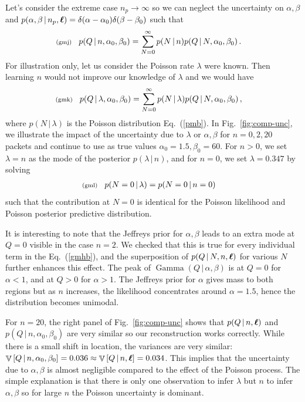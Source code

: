 \documentclass[11pt]{article}
\newcommand{\lleq}[1]{\label{#1} }
\renewcommand{\lleq}[1]{\label{#1} {\scriptstyle {\rm (#1)}} \hspace*{2ex} }
\newcommand{\cond}{\,|\,}
\newcommand{\refeq}[1]{Eq.~(\ref{#1})}
\newcommand{\reffig}[1]{Fig.~\ref{fig:#1}}
\DeclareMathOperator{\GammaDist}{Gamma}
\newcommand{\npack}{{n_p}}
\newcommand{\Lumtot}{Q}
\DeclareMathOperator{\Variance}{\mathbb{V}}
\newcommand{\variance}[1]{\Variance\left[#1\right]}
\begin{document}
Let's consider the extreme case $\npack \to \infty$ so we can neglect
the uncertainty on $\alpha, \beta$ and
$p(\alpha, \beta \cond \npack, \bml) =
\delta(\alpha-\alpha_0)\delta(\beta - \beta_0)$ such that
\begin{align}
  \lleq{gmj}
  p(\Lumtot \cond n, \alpha_0, \beta_0)
  &=     \sum_{N=0}^\infty p(N\cond n) p(Q\cond N, \alpha_0, \beta_0) \, .
\end{align}
For illustration only, let us consider the Poisson rate $\lambda$ were
known. Then learning $n$ would not improve our knowledge of $\lambda$
and we would have
\begin{align}
  \lleq{gmk}
  p(\Lumtot \cond \lambda, \alpha_0, \beta_0)
  &=     \sum_{N=0}^\infty p(N\cond \lambda) p(Q\cond N, \alpha_0, \beta_0) \, ,
\end{align}
where $p(N \cond \lambda)$ is the Poisson distribution \refeq{pmb}.
In \reffig{comp-unc}, we illustrate the impact of the uncertainty due
to $\lambda$ or $\alpha, \beta$ for $n=0,2, 20$ packets and continue
to use as true values $\alpha_0 = 1.5, \beta_0 = 60$. For $n>0$, we
set $\lambda=n$ as the mode of the posterior $p(\lambda \cond n)$, and
for $n=0$, we set $\lambda = 0.347$ by solving
\begin{align}
  \lleq{gml}
  p(N=0 \cond \lambda) &= p(N=0 \cond n=0)
\end{align}
such that the contribution at $N=0$ is identical for the Poisson
likelihood and Poisson posterior predictive distribution.

It is interesting to note that the Jeffreys prior for $\alpha, \beta$
leads to an extra mode at $\Lumtot = 0$ visible in the case $n=2$. We
checked that this is true for every individual term in the
\refeq{gmhb}, and the superposition of $p(\Lumtot \cond N, n, \bml)$
for various $N$ further enhances this effect.  The peak of
$\GammaDist(\Lumtot \cond \alpha, \beta)$ is at $\Lumtot=0$ for
$\alpha<1$, and at $\Lumtot > 0$ for $\alpha>1$. The Jeffreys prior
for $\alpha$ gives mass to both regions but as $n$ increases, the
likelihood concentrates around $\alpha=1.5$, hence the distribution
becomes unimodal.

For $n=20$, the right panel of \reffig{comp-unc} shows that
$p(Q \cond n, \bml)$ and $p(Q \cond n, \alpha_0, \beta_0)$ are very
similar so our reconstruction works correctly. While there is a small
shift in location, the variances are very similar:
$\variance{Q \cond n, \alpha_0, \beta_0}=0.036 \approx \variance{Q
  \cond n, \bml} = 0.034$.  This implies that the uncertainty due to
$\alpha, \beta$ is almost negligible compared to the effect of the
Poisson process. The simple explanation is that there is only one
observation to infer $\lambda$ but $n$ to infer $\alpha, \beta$ so for
large $n$ the Poisson uncertainty is dominant.
\end{document}
